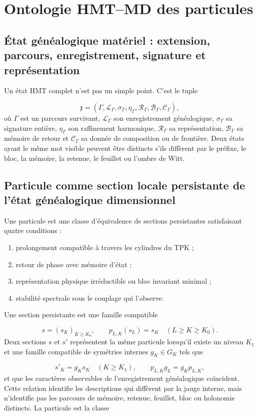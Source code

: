\section{Ontologie HMT--MD des particules}
\subsection{État généalogique matériel : extension, parcours, enregistrement, signature et représentation}
Un état HMT complet n'est pas un simple point. C'est le tuple

\[
 \mathfrak x=
 (\Gamma,\mathcal L_\Gamma,\sigma_\Gamma,\eta_\Gamma,
 \mathcal R_\Gamma,\mathcal B_\Gamma,\mathcal C_\Gamma),
\]
où \(\Gamma\) est un parcours survivant, \(\mathcal L_\Gamma\) son enregistrement généalogique, \(\sigma_\Gamma\) sa signature entière, \(\eta_\Gamma\) son raffinement harmonique, \(\mathcal R_\Gamma\) sa représentation, \(\mathcal B_\Gamma\) sa mémoire de retour et \(\mathcal C_\Gamma\) sa donnée de composition ou de frontière. Deux états ayant le même mot visible peuvent être distincts s'ils diffèrent par le préfixe, le bloc, la mémoire, la retenue, le feuillet ou l'ombre de Witt.

\subsection{Particule comme section locale persistante de l'état généalogique dimensionnel}
Une particule est une classe d'équivalence de sections persistantes satisfaisant quatre conditions :

\begin{enumerate}
\item prolongement compatible à travers les cylindres du TPK ;
\item retour de phase avec mémoire d'état ;
\item représentation physique irréductible ou bloc invariant minimal ;
\item stabilité spectrale sous le couplage qui l'observe.
\end{enumerate}
Une section persistante est une famille compatible

\[
 s=(s_K)_{K\ge K_0},\qquad
 p_{L,K}(s_L)=s_K\quad(L\ge K\ge K_0).
\]
Deux sections \(s\) et \(s'\) représentent la même particule lorsqu'il existe un niveau \(K_1\) et une famille compatible de symétries internes \(g_K\in G_K\) tels que

\[
 s'_K=g_Ks_K\quad(K\ge K_1),
 \qquad
 p_{L,K}g_L=g_Kp_{L,K},
\]
et que les caractères observables de l'enregistrement généalogique coïncident. Cette relation identifie les descriptions qui diffèrent par la jauge interne, mais n'identifie pas les parcours de mémoire, retenue, feuillet, bloc ou holonomie distincts. La particule est la classe

